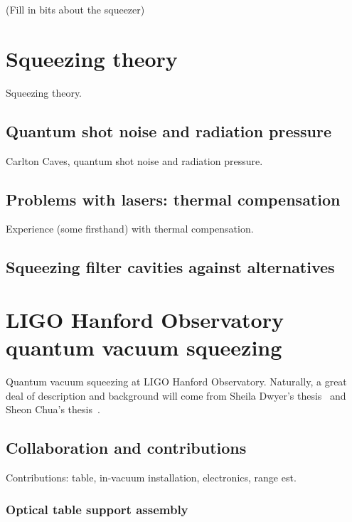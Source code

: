 

    (Fill in bits about the squeezer)

    \section{Squeezing theory}
    \label{squeezing_theory}

        Squeezing theory.

        \subsection{Quantum shot noise and radiation pressure}
        \label{quantum_noise}

            Carlton Caves, quantum shot noise and radiation pressure.

        \subsection{Problems with lasers: thermal compensation}
        \label{TCS}

            Experience (some firsthand) with thermal compensation.

        \subsection{Squeezing filter cavities against alternatives}
        \label{third-gen_squeezing}

    \section{LIGO Hanford Observatory quantum vacuum squeezing}
    \label{LHO_squeeze}

        Quantum vacuum squeezing at LIGO Hanford Observatory. Naturally, a great deal of description and background will come from Sheila Dwyer's thesis~\cite{DwyerThesis} and Sheon Chua's thesis~\cite{ChuaThesis}.

        \subsection{Collaboration and contributions}
        \label{contributions}

            Contributions: table, in-vacuum installation, electronics, range est.

            \subsubsection{Optical table support assembly}
            \label{table_legs}


